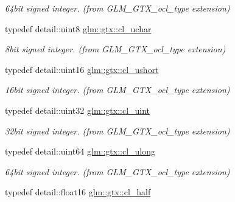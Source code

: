 \begin{DoxyCompactItemize}
\begin{DoxyCompactList}\small\item\em 64bit signed integer. (from G\+L\+M\+\_\+\+G\+T\+X\+\_\+ocl\+\_\+type extension) \end{DoxyCompactList}\item 
\hypertarget{group__gtx__ocl__type_gab4f91f67e35aec531b023cc1399d59a2}{}typedef detail\+::uint8 \hyperlink{group__gtx__ocl__type_gab4f91f67e35aec531b023cc1399d59a2}{glm\+::gtx\+::cl\+\_\+uchar}\label{group__gtx__ocl__type_gab4f91f67e35aec531b023cc1399d59a2}

\begin{DoxyCompactList}\small\item\em 8bit signed integer. (from G\+L\+M\+\_\+\+G\+T\+X\+\_\+ocl\+\_\+type extension) \end{DoxyCompactList}\item 
\hypertarget{group__gtx__ocl__type_gadb8d08266d317276d6c8cd22ac5a5b12}{}typedef detail\+::uint16 \hyperlink{group__gtx__ocl__type_gadb8d08266d317276d6c8cd22ac5a5b12}{glm\+::gtx\+::cl\+\_\+ushort}\label{group__gtx__ocl__type_gadb8d08266d317276d6c8cd22ac5a5b12}

\begin{DoxyCompactList}\small\item\em 16bit signed integer. (from G\+L\+M\+\_\+\+G\+T\+X\+\_\+ocl\+\_\+type extension) \end{DoxyCompactList}\item 
\hypertarget{group__gtx__ocl__type_gae06a7a97c5055b8a98845c2cd28bc47a}{}typedef detail\+::uint32 \hyperlink{group__gtx__ocl__type_gae06a7a97c5055b8a98845c2cd28bc47a}{glm\+::gtx\+::cl\+\_\+uint}\label{group__gtx__ocl__type_gae06a7a97c5055b8a98845c2cd28bc47a}

\begin{DoxyCompactList}\small\item\em 32bit signed integer. (from G\+L\+M\+\_\+\+G\+T\+X\+\_\+ocl\+\_\+type extension) \end{DoxyCompactList}\item 
\hypertarget{group__gtx__ocl__type_ga491ef031f0cdb6946b9aa6431e51d2e6}{}typedef detail\+::uint64 \hyperlink{group__gtx__ocl__type_ga491ef031f0cdb6946b9aa6431e51d2e6}{glm\+::gtx\+::cl\+\_\+ulong}\label{group__gtx__ocl__type_ga491ef031f0cdb6946b9aa6431e51d2e6}

\begin{DoxyCompactList}\small\item\em 64bit signed integer. (from G\+L\+M\+\_\+\+G\+T\+X\+\_\+ocl\+\_\+type extension) \end{DoxyCompactList}\item 
\hypertarget{group__gtx__ocl__type_ga3f972abf9bd743f67eb4920b9beb7e43}{}typedef detail\+::float16 \hyperlink{group__gtx__ocl__type_ga3f972abf9bd743f67eb4920b9beb7e43}{glm\+::gtx\+::cl\+\_\+half}\label{group__gtx__ocl__type_ga3f972abf9bd743f67eb4920b9beb7e43}


\end{DoxyCompactItemize}
